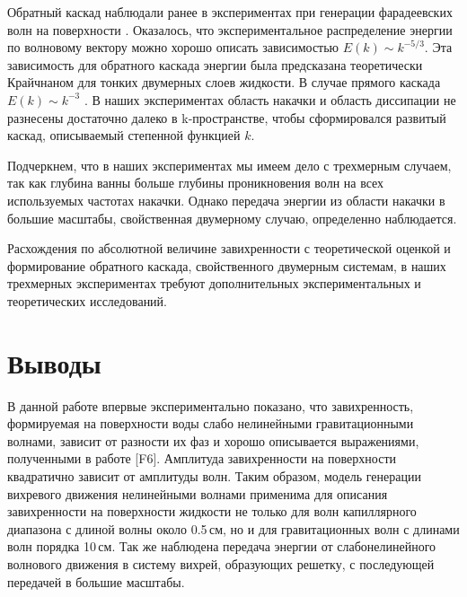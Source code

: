 Обратный каскад наблюдали ранее в экспериментах при генерации фарадеевских волн на поверхности \cite{Francois2014}. Оказалось, что экспериментальное распределение энергии по волновому вектору можно хорошо описать зависимостью $E(k) \sim k^{-5/3}$. Эта зависимость для обратного каскада энергии была предсказана теоретически Крайчнаном \cite{Kraichnan1967} для тонких двумерных слоев жидкости. В случае прямого каскада $E(k) \sim k^{-3}$ \cite{Kraichnan1967}. В наших экспериментах область накачки и область диссипации не разнесены достаточно далеко в k-пространстве, чтобы сформировался развитый каскад, описываемый степенной функцией $k$.

Подчеркнем, что в наших экспериментах мы имеем дело с трехмерным случаем, так как глубина ванны больше глубины проникновения волн на всех используемых частотах накачки. Однако передача энергии из области накачки в большие масштабы, свойственная двумерному случаю, определенно наблюдается. 

Расхождения по абсолютной величине завихренности с теоретической оценкой и формирование обратного каскада, свойственного двумерным системам, в наших трехмерных экспериментах требуют дополнительных экспериментальных и теоретических исследований.

\section{Выводы} \label{sect4_5}
В данной работе впервые экспериментально показано, что завихренность, формируемая на поверхности воды слабо нелинейными гравитационными волнами, зависит от разности их фаз и хорошо описывается выражениями, полученными в работе [F6]. Амплитуда завихренности на поверхности квадратично зависит от амплитуды волн. Таким образом, модель генерации вихревого движения нелинейными волнами применима для описания завихренности на поверхности жидкости не только для волн капиллярного диапазона с длиной волны около 0.5\,см, но и для гравитационных волн с длинами волн порядка 10\,см. Так же наблюдена передача энергии от слабонелинейного волнового движения в систему вихрей, образующих решетку, с последующей передачей в большие масштабы.



\clearpage